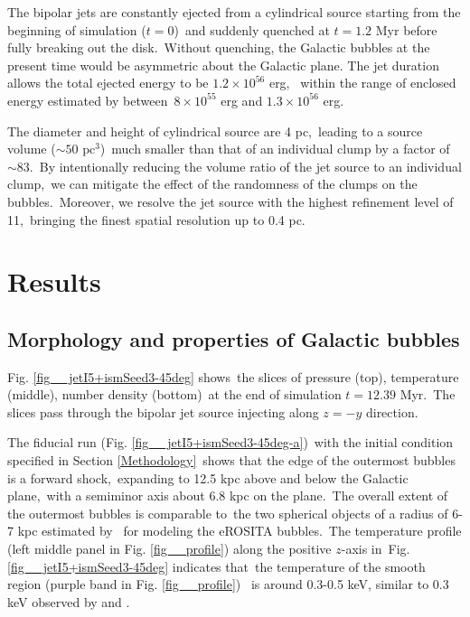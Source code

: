 \documentclass[fleqn,usenatbib,useAMS]{mnras}
\begin{document}
  The bipolar jets are constantly ejected from a cylindrical source starting from the beginning of simulation ($t=0$)\
  and suddenly quenched at $t=1.2$ Myr before fully breaking out the disk.\
  Without quenching, the Galactic bubbles at the present time would be asymmetric about the Galactic plane.
  The jet duration allows the total ejected energy to be $1.2\times10^{56}$ erg, \
  within the range of enclosed energy estimated by \citet{Predehl2020} between\
  $8\times10^{55}$ erg and $1.3\times10^{56}$ erg.



  The diameter and height of cylindrical source are 4 pc,\
  leading to a source volume ($\sim 50 \text{ pc}^{3}$)\
  much smaller than that of an individual clump by a factor of $\sim 83$.\
  By intentionally reducing the volume ratio of the jet source to an individual clump,\
  we can mitigate the effect of the randomness of the clumps on the bubbles.\
  Moreover, we resolve the jet source with the highest refinement level of 11,\
  bringing the finest spatial resolution up to 0.4 pc.\

\section{Results}
\label{Results}

\subsection{Morphology and properties of Galactic bubbles}

 Fig. \ref{fig__jetI5+ismSeed3-45deg} shows\
 the slices of pressure (top), temperature (middle), number density (bottom)\
 at the end of simulation $t=12.39$ Myr.\
 The slices pass through the bipolar jet source injecting along $z=-y$ direction.

 The fiducial run (Fig. \ref{fig__jetI5+ismSeed3-45deg-a})\
 with the initial condition specified in Section \ref{Methodology}\
 shows that the edge of the outermost bubbles is a forward shock,\
 expanding to 12.5 kpc above and below the Galactic plane,\
 with a semiminor axis about 6.8 kpc on the plane.\
 The overall extent of the outermost bubbles is comparable to\
 the two spherical objects of a radius of 6-7 kpc estimated by \citet{Predehl2020}\
 for modeling the eROSITA bubbles.\
 The temperature profile (left middle panel in Fig. \ref{fig__profile}) along the positive $z$-axis in\
 Fig. \ref{fig__jetI5+ismSeed3-45deg} indicates that\
 the temperature of the smooth region (purple band in Fig. \ref{fig__profile})\ %
 is around 0.3-0.5 keV, similar to 0.3 keV observed by \citet{Miller2016} and \citet{Kataoka2018}. %
\end{document}
